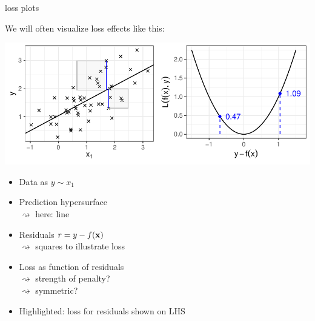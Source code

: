 \documentclass[11pt,compress,t,notes=noshow, xcolor=table]{beamer}
\begin{document}
\begin{frame}{loss plots}

We will often visualize loss effects like this:

\vfill

\includegraphics[width=\textwidth]{figure/reg_l2_lossplot_quad.pdf}

\hspace{0.5cm}
\begin{minipage}[t]{0.45\textwidth}
    \footnotesize
    \begin{itemize}
        \item Data as $y \sim x_1$
        \item Prediction hypersurface \\$\rightsquigarrow$ here: line
        \item Residuals \textcolor{blue}{$r = y - f(\mathbf{x})$}
        \\$\rightsquigarrow$ squares to illustrate loss
    \end{itemize}
\end{minipage}
\hfill
\begin{minipage}[t]{0.4\textwidth}
    \footnotesize
    \begin{itemize}
        \item Loss as function of residuals
        \\$\rightsquigarrow$ strength of penalty? 
        \\$\rightsquigarrow$ symmetric?
        \item Highlighted: loss for residuals shown on LHS
    \end{itemize}
\end{minipage}

\end{frame}

\end{document}
